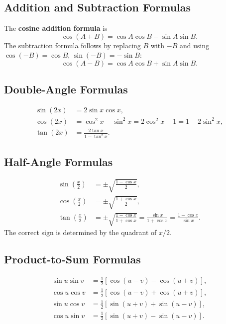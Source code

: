 \subsection*{Addition and Subtraction Formulas}

The \textbf{cosine addition formula} is
\[
  \cos(A + B) = \cos A \cos B - \sin A \sin B.
\]
The subtraction formula follows by replacing $B$ with $-B$ and using
$\cos(-B) = \cos B$, $\sin(-B) = -\sin B$:
\[
  \cos(A - B) = \cos A \cos B + \sin A \sin B.
\]

\subsection*{Double-Angle Formulas}

\begin{align}
  \sin(2x) &= 2\sin x \cos x, \\
  \cos(2x) &= \cos^{2}x - \sin^{2}x = 2\cos^{2}x - 1 = 1 - 2\sin^{2}x, \\
  \tan(2x) &= \frac{2\tan x}{1 - \tan^{2}x}.
\end{align}

\subsection*{Half-Angle Formulas}

\begin{align}
  \sin\!\left(\frac{x}{2}\right) &= \pm\sqrt{\frac{1 - \cos x}{2}}, \\
  \cos\!\left(\frac{x}{2}\right) &= \pm\sqrt{\frac{1 + \cos x}{2}}, \\
  \tan\!\left(\frac{x}{2}\right)
    &= \pm\sqrt{\frac{1 - \cos x}{1 + \cos x}}
     = \frac{\sin x}{1 + \cos x}
     = \frac{1 - \cos x}{\sin x}.
\end{align}
The correct sign is determined by the quadrant of $x/2$.

\subsection*{Product-to-Sum Formulas}

\begin{align}
  \sin u \sin v &= \tfrac{1}{2}[\cos(u-v) - \cos(u+v)], \\
  \cos u \cos v &= \tfrac{1}{2}[\cos(u-v) + \cos(u+v)], \\
  \sin u \cos v &= \tfrac{1}{2}[\sin(u+v) + \sin(u-v)], \\
  \cos u \sin v &= \tfrac{1}{2}[\sin(u+v) - \sin(u-v)].
\end{align}


